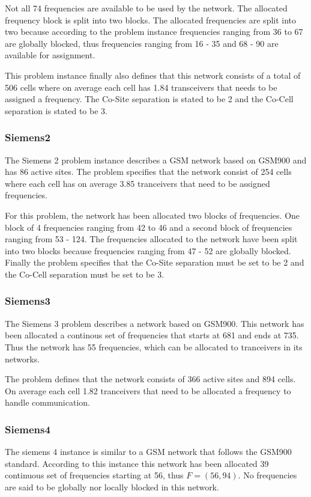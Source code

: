 Not all 74 frequencies are available to be used by the network. The allocated frequency block is split into two blocks. The allocated frequencies are split into two because according to the problem instance frequencies ranging from 36 to 67 are globally blocked, thus frequencies ranging from 16  - 35 and 68 - 90 are available for assignment.

This problem instance finally also defines that this network consists of a total of 506 cells where on average each cell has 1.84 transceivers that needs to be assigned a frequency. The Co-Site separation is stated to be 2 and the Co-Cell separation is stated to be 3.
\subsubsection{Siemens2}
The Siemens 2 problem instance describes a GSM network based on GSM900 and has 86 active sites. The problem specifies that the network consist of 254 cells where each cell has on average 3.85 tranceivers that need to be assigned frequencies.

For this problem, the network has been allocated two blocks of frequencies. One block of 4 frequencies ranging from 42 to 46 and a second block of frequencies ranging from 53 - 124. The frequencies allocated to the network have been split into two blocks because frequencies ranging from 47 - 52 are globally blocked. Finally the problem specifies that the Co-Site separation must be set to be 2 and the Co-Cell separation must be set to be 3.
\subsubsection{Siemens3}
The Siemens 3 problem describes a network based on GSM900. This network has been allocated a continous set of frequencies that starts at 681 and ends at 735. Thus the network has 55 frequencies, which can be allocated to tranceivers in its networks.

The problem defines that the network consists of 366 active sites and 894 cells. On average each cell 1.82 tranceivers that need to be allocated a frequency to handle communication.
\subsubsection{Siemens4}
The siemens 4 instance is similar to a GSM network that follows the GSM900 standard. According to this instance this network has been allocated 39 continuous set of frequencies starting at 56, thus $F = (56,94)$. No frequencies are said to be globally nor locally blocked in this network.

